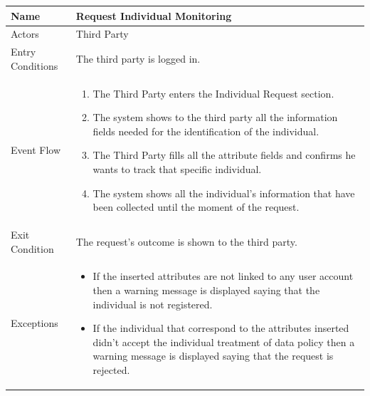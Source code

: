 \begin{enumerate}
\FloatBarrier
\begin{table}[h]
\begin{tabular}{|l|p{}|}
\hline
Name             & Request Individual Monitoring \\ \hline
Actors           & Third Party  \\ \hline
Entry Conditions & The third party is logged in.    \\ \hline
Event Flow       & \begin{enumerate}
            \item The Third Party enters the Individual Request section.         
            \item The system shows to the third party all the information fields needed for the identification of the individual.
            \item The Third Party fills all the attribute fields and confirms he wants to track that specific individual.
            \item The system shows all the individual's information that have been collected until the moment of the request. 
        \end{enumerate}\\ \hline
Exit Condition   & The request's outcome is shown to the third party.\\ \hline
Exceptions       & \begin{itemize}
\item If the inserted attributes are not linked to any user account then a warning message is displayed saying that the individual is not registered.
\item If the individual that correspond to the attributes inserted didn't accept the individual treatment of data policy then a warning message is displayed saying that the request is rejected.
\end{itemize}\\ \hline
\end{tabular}
\end{table}
\FloatBarrier


\end{enumerate}
